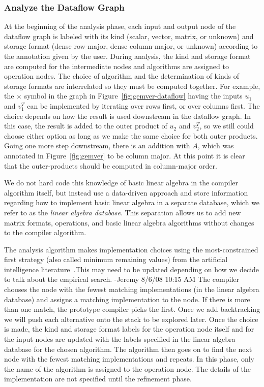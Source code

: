 \documentclass[11pt]{article}
\begin{document}
\subsubsection{Analyze the Dataflow Graph}

At the beginning of the analysis phase, each input and output node of the dataflow graph is labeled with its kind (scalar, vector, matrix, or unknown) and storage format (dense row-major, dense column-major, or unknown) according to the annotation given by the user.  During analysis, the kind and storage format are computed for the intermediate nodes and algorithms are assigned to operation nodes. The choice of algorithm and the determination of kinds of storage formats are interrelated so they must be computed together.  For example, the $\times$ symbol in the graph in Figure~\ref{fig:gemver-dataflow} having the inputs $u_1$ and $v_1^T$ can be implemented by iterating over rows first, or over columns first. The choice depends on how the result is used downstream in the dataflow graph.  In this case, the result is added to the outer product of $u_2$ and $v_2^T$, so we still could choose either option as long as we make the same choice for both outer products. Going one more step downstream, there is an addition with $A$, which was annotated in Figure~\ref{fig:gemver} to be column major. At this point it is clear that the outer-products should be computed in column-major order.

We do not hard code this knowledge of basic linear algebra in the compiler algorithm itself, but instead use a data-driven approach and store information regarding how to implement basic linear algebra in a separate database, which we refer to as the \emph{linear algebra database}.  This separation allows us to add new matrix formats, operations, and basic linear algebra algorithms without changes to the
compiler algorithm. 

The analysis algorithm makes implementation choices using the most-constrained first strategy (also called minimum remaining values)
from the artificial intelligence literature~\cite{Russell:2003mz}.This may need to be updated depending on how we decide to talk about the empirical search. -Jeremy 8/6/08 10:15 AM 
The compiler chooses the node with the fewest matching implementations (in the linear algebra database) and assigns a matching implementation to the node.  If there is more than one match, the prototype compiler picks the first.  Once we add backtracking we will push each alternative onto the stack to be explored later. Once the choice is made, the kind and storage format labels for the operation node itself and for the input nodes are updated with the labels specified in the linear algebra database for the chosen algorithm. The algorithm then goes on to find the next node with the fewest matching implementations and repeats.  In this phase, only the name of the algorithm is assigned to the operation node.  The details of the implementation are not specified until the refinement phase.
\end{document}
